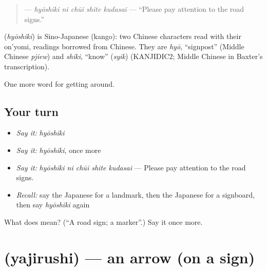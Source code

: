 \begin{quote}
\textbf{  } — \emph{hyōshiki ni chūi shite kudasai} — \textquotedblleft{}Please pay attention to the road signs.\textquotedblright{}
\end{quote}

\begin{cousinweb}
\textbf{} (\emph{hyōshiki}) is Sino-Japanese (kango): two Chinese characters read with their on'yomi, readings borrowed from Chinese. They are \emph{hyō}, \textquotedblleft{}signpost\textquotedblright{} (Middle Chinese \emph{pjiew}) and \emph{shiki}, \textquotedblleft{}know\textquotedblright{} (\emph{syik}) (KANJIDIC2; Middle Chinese in Baxter's transcription).
\end{cousinweb}

\begin{grammarlens}[title={What you've built}]
One more word for getting around.
\end{grammarlens}

\subsection*{Your turn}
\begin{itemize}
\raggedright
  \item \emph{Say it:} \emph{hyōshiki}
  \item \emph{Say it:} \emph{hyōshiki}, once more
  \item \emph{Say it:} \emph{hyōshiki ni chūi shite kudasai} — Please pay attention to the road signs.
  \item \emph{Recall:} say the Japanese for a landmark, then the Japanese for a signboard, then say \emph{hyōshiki} again
\end{itemize}

\begin{tcolorbox}[breakable,colback=teal!4,colframe=teal!35!black,title={Before you move on}]
What does  mean? (\textquotedblleft{}A road sign; a marker\textquotedblright{}.) Say it once more.
\end{tcolorbox}
\section[\texorpdfstring{\ja{やじるし} (yajirushi)}{やじるし (yajirushi)}]{ (yajirushi) — an arrow (on a sign)}

\label{lesson:JA-C393-yajirushi}



